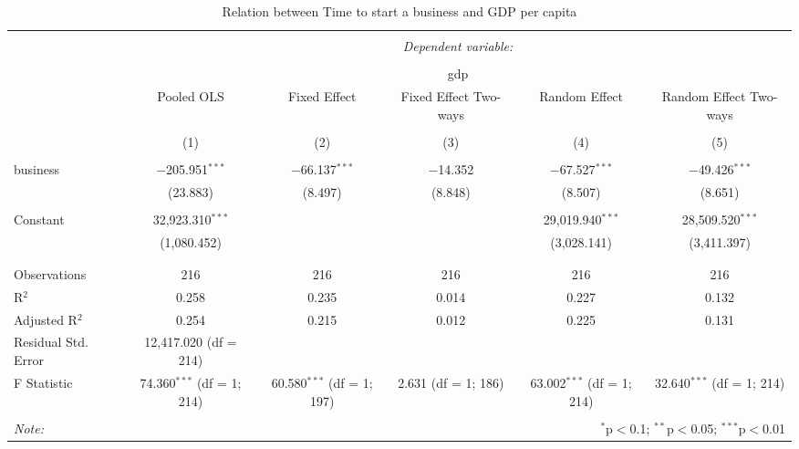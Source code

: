 \documentclass{article}
\begin{document}
\begin{table}[p!] \centering 
  \caption{Relation between Time to start a business and GDP per capita} 
  \label{} 
\begin{tabular}{@{\extracolsep{5pt}}lccccc} 
\\[-1.8ex]\hline 
\hline \\[-1.8ex] 
 & \multicolumn{5}{c}{\textit{Dependent variable:}} \\ 
\cline{2-6} 
\\[-1.8ex] & \multicolumn{5}{c}{gdp} \\ 
 & Pooled OLS & Fixed Effect & Fixed Effect Two-ways & Random Effect & Random Effect Two-ways \\ 
\\[-1.8ex] & (1) & (2) & (3) & (4) & (5)\\ 
\hline \\[-1.8ex] 
 business & $-$205.951$^{***}$ & $-$66.137$^{***}$ & $-$14.352 & $-$67.527$^{***}$ & $-$49.426$^{***}$ \\ 
  & (23.883) & (8.497) & (8.848) & (8.507) & (8.651) \\ 
  & & & & & \\ 
 Constant & 32,923.310$^{***}$ &  &  & 29,019.940$^{***}$ & 28,509.520$^{***}$ \\ 
  & (1,080.452) &  &  & (3,028.141) & (3,411.397) \\ 
  & & & & & \\ 
\hline \\[-1.8ex] 
Observations & 216 & 216 & 216 & 216 & 216 \\ 
R$^{2}$ & 0.258 & 0.235 & 0.014 & 0.227 & 0.132 \\ 
Adjusted R$^{2}$ & 0.254 & 0.215 & 0.012 & 0.225 & 0.131 \\ 
Residual Std. Error & 12,417.020 (df = 214) &  &  &  &  \\ 
F Statistic & 74.360$^{***}$ (df = 1; 214) & 60.580$^{***}$ (df = 1; 197) & 2.631 (df = 1; 186) & 63.002$^{***}$ (df = 1; 214) & 32.640$^{***}$ (df = 1; 214) \\ 
\hline 
\hline \\[-1.8ex] 
\textit{Note:}  & \multicolumn{5}{r}{$^{*}$p$<$0.1; $^{**}$p$<$0.05; $^{***}$p$<$0.01} \\ 
\end{tabular} 
\end{table} 
\end{document}
